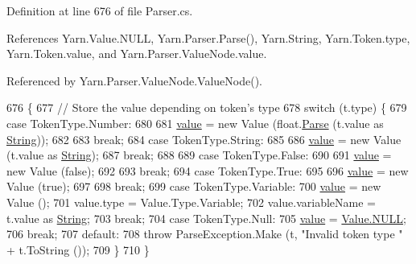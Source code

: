 Definition at line 676 of file Parser.\-cs.



References Yarn.\-Value.\-N\-U\-L\-L, Yarn.\-Parser.\-Parse(), Yarn.\-String, Yarn.\-Token.\-type, Yarn.\-Token.\-value, and Yarn.\-Parser.\-Value\-Node.\-value.



Referenced by Yarn.\-Parser.\-Value\-Node.\-Value\-Node().


\begin{DoxyCode}
676                                            \{
677                 \textcolor{comment}{// Store the value depending on token's type}
678                 \textcolor{keywordflow}{switch} (t.type) \{
679                 \textcolor{keywordflow}{case} TokenType.Number:
680 
681                     \hyperlink{a00182_a51ab5939344f9bfa21181c02cf0e341d}{value} = \textcolor{keyword}{new} Value (\textcolor{keywordtype}{float}.\hyperlink{a00143_a811cc7226f4f4a2f3440cdb67ad14468}{Parse} (t.value as \hyperlink{a00045_a301aa7c866593a5b625a8fc158bbeacea27118326006d3829667a400ad23d5d98}{String}));
682 
683                     \textcolor{keywordflow}{break};
684                 \textcolor{keywordflow}{case} TokenType.String:
685 
686                     \hyperlink{a00182_a51ab5939344f9bfa21181c02cf0e341d}{value} = \textcolor{keyword}{new} Value (t.value as \hyperlink{a00045_a301aa7c866593a5b625a8fc158bbeacea27118326006d3829667a400ad23d5d98}{String});
687                     \textcolor{keywordflow}{break};
688 
689                 \textcolor{keywordflow}{case} TokenType.False:
690 
691                     \hyperlink{a00182_a51ab5939344f9bfa21181c02cf0e341d}{value} = \textcolor{keyword}{new} Value (\textcolor{keyword}{false});
692 
693                     \textcolor{keywordflow}{break};
694                 \textcolor{keywordflow}{case} TokenType.True:
695 
696                     \hyperlink{a00182_a51ab5939344f9bfa21181c02cf0e341d}{value} = \textcolor{keyword}{new} Value (\textcolor{keyword}{true});
697 
698                     \textcolor{keywordflow}{break};
699                 \textcolor{keywordflow}{case} TokenType.Variable:
700                     \hyperlink{a00182_a51ab5939344f9bfa21181c02cf0e341d}{value} = \textcolor{keyword}{new} Value ();
701                     value.type = Value.Type.Variable;
702                     value.variableName = t.value as \hyperlink{a00045_a301aa7c866593a5b625a8fc158bbeacea27118326006d3829667a400ad23d5d98}{String};
703                     \textcolor{keywordflow}{break};
704                 \textcolor{keywordflow}{case} TokenType.Null:
705                     \hyperlink{a00182_a51ab5939344f9bfa21181c02cf0e341d}{value} = \hyperlink{a00181_a1ed2964965baca8621c45efa23f37660}{Value.NULL};
706                     \textcolor{keywordflow}{break};
707                 \textcolor{keywordflow}{default}:
708                     \textcolor{keywordflow}{throw} ParseException.Make (t, \textcolor{stringliteral}{"Invalid token type "} + t.ToString ());
709                 \}
710             \}
\end{DoxyCode}


